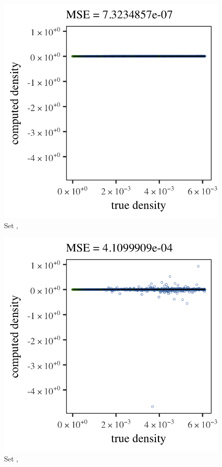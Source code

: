 \begin{subfigure}{0.23\textwidth}
	\centering
	\includegraphics[keepaspectratio=true, width=\textwidth, height=0.23\textheight]{4/img/all/results_baakman_4_60000_mbe_silverman}
	\caption{Set \baakmanFour, \mbe}
	\label{fig:4:results:mbe:baakman4}
\end{subfigure}	
\begin{subfigure}{0.23\textwidth}
	\centering
	\includegraphics[keepaspectratio=true, width=\textwidth, height=0.23\textheight]{4/img/all/results_baakman_4_60000_sambe_silverman}
	\caption{Set \baakmanFour, \sambe}
	\label{fig:4:results:sambe:baakman4}
\end{subfigure}	
